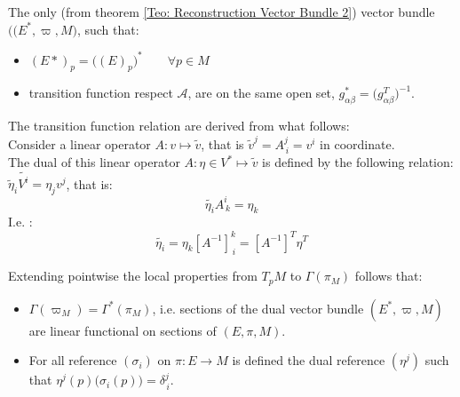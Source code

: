 \documentclass[a4paper,12pt]{scrartcl}    %
\begin{document}
\begin{definition}\label{Def: Dual vector bundle}
	The only (from theorem \ref{Teo: Reconstruction Vector Bundle 2}) vector bundle $\big( (E^*, \varpi,M \big)$, such that:
	\begin{itemize}
		\item $(E* ) _p = \big(( E)_p \big) ^* \qquad \forall p \in M$
		\item transition function respect $\mathcal{A}$, are on the same open set, $g^*_{\alpha \beta} =\big( g_{\alpha	\beta}^T \big)^{-1}$.
	\end{itemize}
\end{definition}
\begin{observation}
	The transition function relation are derived from what follows:
	\\
	Consider a linear operator $ A: v \mapsto\tilde{v}$, that is $\tilde{v}^j = A^j_{\, i} = v^i$  in coordinate.
	\\
	The dual of this linear operator $ A : \eta \in V^* \mapsto \tilde{v}$ is defined by the following relation: $\tilde{\eta}_i \tilde{V^i} = \eta_j v^j $, that is:
	\begin{displaymath}
		\tilde{\eta_i} A^i_{\, k} = \eta_k
	\end{displaymath}
	I.e. :
	\begin{displaymath}
		\tilde{\eta_i}= \eta_k [A^{-1} ]^k_{\, i} =[A^{-1} ]^T \eta^T
	\end{displaymath}
\end{observation}

\begin{observation}
Extending pointwise the local properties from $T_pM$ to $\Gamma(\pi_M)$ follows that:
	\begin{itemize}
		\item $\Gamma(\varpi_M) = \Gamma^*(\pi_M)$, i.e. sections of the dual vector bundle $(E^*, \varpi, M)$ are linear functional on sections of $(E, \pi, M)$.
		\item For all reference $(\sigma_i)$ on $\pi:E\rightarrow M$ is defined the dual reference $(\eta^j)$ such that $ \eta^j(p) \big(\sigma_i(p)\big)= \delta^j_{\, i}$.
	\end{itemize}
\end{observation}
\end{document}
